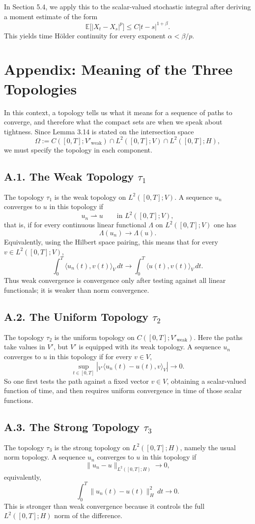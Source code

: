 \documentclass[11pt]{article}
\theoremstyle{definition}
\theoremstyle{remark}
\newcommand{\dual}[2]{{}_{V'}\langle #1, #2 \rangle_{V}}
\begin{document}
In Section 5.4, we apply this to the scalar-valued stochastic integral after deriving a moment estimate of the form
\[
  \mathbb E\bigl[|X_t-X_s|^p\bigr]\le C|t-s|^{1+\beta}.
\]
This yields time H\"older continuity for every exponent $\alpha<\beta/p$.

\section*{Appendix: Meaning of the Three Topologies}
In this context, a topology tells us what it means for a sequence of paths to converge, and therefore what the compact sets are when we speak about tightness. Since Lemma 3.14 is stated on the intersection space
\[
  \Omega:=C([0,T];V'_{\mathrm{weak}})\cap L^2([0,T];V)\cap L^2([0,T];H),
\]
we must specify the topology in each component.

\subsection*{A.1. The Weak Topology $\tau_1$}
The topology $\tau_1$ is the weak topology on $L^2([0,T];V)$. A sequence $u_n$ converges to $u$ in this topology if
\[
  u_n\rightharpoonup u
  \qquad \text{in } L^2([0,T];V),
\]
that is, if for every continuous linear functional $\Lambda$ on $L^2([0,T];V)$ one has
\[
  \Lambda(u_n)\to \Lambda(u).
\]
Equivalently, using the Hilbert space pairing, this means that for every $v\in L^2([0,T];V)$,
\[
  \int_0^T \langle u_n(t),v(t)\rangle_V\,dt
  \to
  \int_0^T \langle u(t),v(t)\rangle_V\,dt.
\]
Thus weak convergence is convergence only after testing against all linear functionals; it is weaker than norm convergence.

\subsection*{A.2. The Uniform Topology $\tau_2$}
The topology $\tau_2$ is the uniform topology on $C([0,T];V'_{\mathrm{weak}})$. Here the paths take values in $V'$, but $V'$ is equipped with its weak topology. A sequence $u_n$ converges to $u$ in this topology if for every $v\in V$,
\[
  \sup_{t\in[0,T]}
  \left|
    \dual{u_n(t)-u(t)}{v}
  \right|
  \to 0.
\]
So one first tests the path against a fixed vector $v\in V$, obtaining a scalar-valued function of time, and then requires uniform convergence in time of those scalar functions.

\subsection*{A.3. The Strong Topology $\tau_3$}
The topology $\tau_3$ is the strong topology on $L^2([0,T];H)$, namely the usual norm topology. A sequence $u_n$ converges to $u$ in this topology if
\[
  \|u_n-u\|_{L^2([0,T];H)}\to 0,
\]
equivalently,
\[
  \int_0^T \|u_n(t)-u(t)\|_H^2\,dt \to 0.
\]
This is stronger than weak convergence because it controls the full $L^2([0,T];H)$ norm of the difference.
\end{document}
